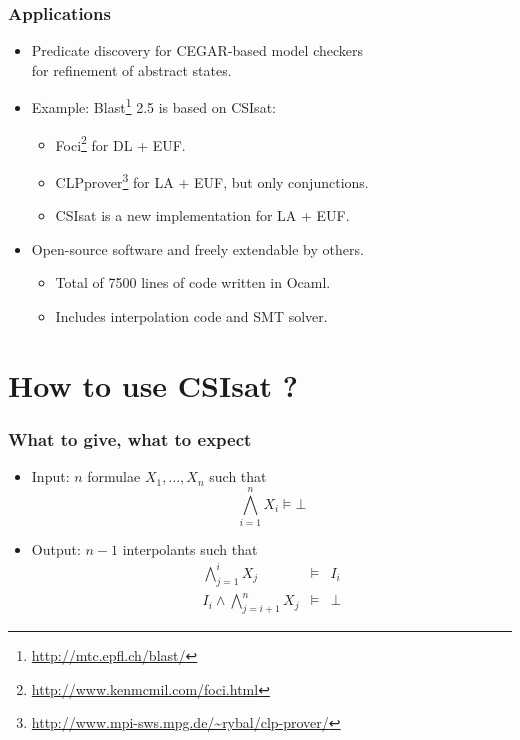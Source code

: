 \documentclass{beamer}
\newcommand{\csisat}{{\sc CSIsat}}
\newcommand{\blast}{{\sc Blast}}
\newcommand{\clpprover}{{\sc CLPprover}}
\newcommand{\foci}{{\sc Foci}}
\begin{document}
\begin{frame}
  \frametitle{Applications}
  \begin{itemize}
  \item Predicate discovery for CEGAR-based model checkers\\
        for refinement of abstract states.
  \item Example: %
        \blast{}\footnote{\url{http://mtc.epfl.ch/blast/}} 2.5 is based on \csisat{}:
    \begin{itemize}
      \item<2-> \foci{}\footnote{\url{http://www.kenmcmil.com/foci.html}} for DL + EUF.
      \item<3-> \clpprover{}\footnote{\url{http://www.mpi-sws.mpg.de/~rybal/clp-prover/}} for LA + EUF, but only conjunctions.
      \item<4-> \csisat{} is a new implementation for LA + EUF.
    \end{itemize}
  \item Open-source software and freely extendable by others.
    \begin{itemize}
    \item Total of 7500 lines of code written in Ocaml.
    \item Includes interpolation code and SMT solver.
    \end{itemize}
  \end{itemize}
\end{frame}

\section{How to use \csisat{} ?}
\begin{frame}
  \frametitle{What to give, what to expect}
  \begin{itemize}
  \item Input: $n$ formulae $X_1, \ldots, X_n$ such that
    \begin{equation*}
      \bigwedge_{i=1}^n X_i \models \bot
    \end{equation*}
  \item Output: $n-1$ interpolants such that
    \begin{eqnarray*}
      \bigwedge_{j=1}^i X_j & \models & I_i \\
      I_i \wedge \bigwedge_{j=i+1}^n X_j & \models & \bot
    \end{eqnarray*}
  \end{itemize}
\end{frame}
\end{document}
